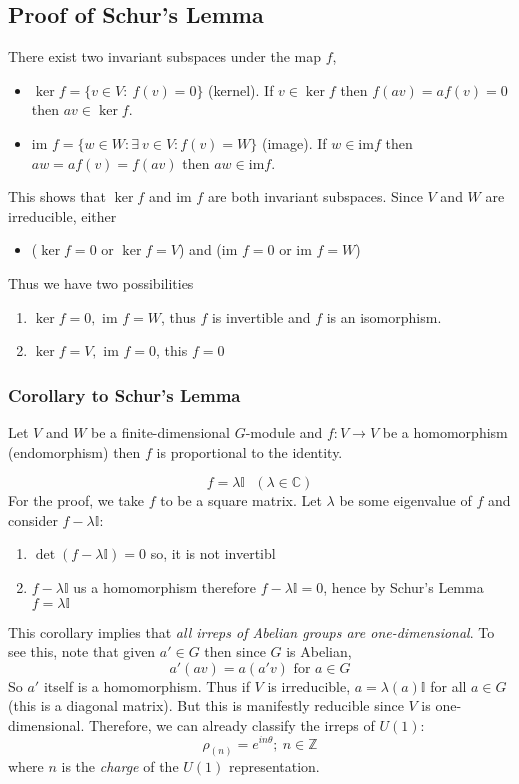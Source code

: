 \begin{enumerate}
\subsection{Proof of Schur's Lemma}
There exist two invariant subspaces under the map $f$, 
\begin{itemize}
    \item $\ker f = \{v\in V: \ f(v)=0\}$ (kernel). If $v\in \ker f$ then $f(av) = af(v)=0$ then $av \in \ker f$. 
    \item im $f = \{w\in W: \exists \ v\in V : f(v) = W\}$ (image). If $w\in \text{im}f$ then $aw = af(v) = f(av)$ then $aw\in \text{im} f$. 
\end{itemize} 
This shows that $\ker f$ and im $f$ are both invariant subspaces. Since $V$ and $W$ are irreducible, either 
\begin{itemize}
    \item ($\ker f = 0$ or $\ker f=V$) and (im $f=0$ or im $f=W$) 
\end{itemize}
Thus we have two possibilities
\begin{enumerate}
    \item $\ker f=0,$ im $f=W$, thus $f$ is invertible and $f$ is an isomorphism. 
    \item $\ker f=V,$ im $f=0$, this $f=0$ 
\end{enumerate}
\subsubsection{Corollary to Schur's Lemma}
Let $V$ and $W$ be a finite-dimensional $G$-module and $f:V\rightarrow V$ be a homomorphism (endomorphism) then $f$ is proportional to the identity.

\begin{equation}
    f = \lambda\mathbb{I}\ \ \ (\lambda\in\mathbb{C})
\end{equation}
For the proof, we take $f$ to be a square matrix. Let $\lambda$ be some eigenvalue of $f$ and consider $f-\lambda\mathbb{I}$:
\begin{enumerate}
    \item $\det(f-\lambda\mathbb{I})=0$ so, it is not invertibl
    \item $f-\lambda\mathbb{I}$ us a homomorphism therefore $f-\lambda\mathbb{I}=0$, hence by Schur's Lemma $f=\lambda\mathbb{I}$
\end{enumerate}
This corollary implies that \textit{all irreps of Abelian groups are one-dimensional}. To see this, note that given $a'\in G$ then since $G$ is Abelian, 
\begin{equation}
    a'(av) = a(a'v) \text{ for } a\in G
\end{equation}
So $a'$ itself is a homomorphism. Thus if $V$ is irreducible, $a = \lambda(a)\mathbb{I}$ for all $a\in G$ (this is a diagonal matrix). But this is manifestly reducible since $V$ is one-dimensional. Therefore, we can already classify the irreps of $U(1)$: 
\begin{equation}
    \rho_{(n)} = e^{in\theta}; \ n\in \mathbb{Z}
\end{equation}
where $n$ is the \textit{charge} of the $U(1)$ representation. 

\end{enumerate}
